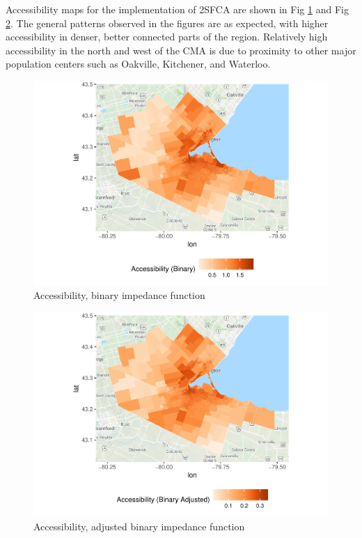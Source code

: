 \documentclass[10pt,letterpaper]{article}
\begin{document}
Accessibility maps for the implementation of 2SFCA are shown in Fig
\ref{fig:fig7-map-accessibility-binary} and Fig
\ref{fig:fig8-map-accessibility-binary-adjusted}. The general patterns
observed in the figures are as expected, with higher accessibility in
denser, better connected parts of the region. Relatively high
accessibility in the north and west of the CMA is due to proximity to
other major population centers such as Oakville, Kitchener, and
Waterloo.

\begin{figure}
\centering
\includegraphics{Supply_and_Demand_Inflation_in_FCA_Methods_v2.0_files/figure-latex/fig7-map-accessibility-binary-1.pdf}
\caption{\label{fig:fig7-map-accessibility-binary}Accessibility, binary
impedance function}
\end{figure}

\begin{figure}
\centering
\includegraphics{Supply_and_Demand_Inflation_in_FCA_Methods_v2.0_files/figure-latex/fig8-map-accessibility-binary-adjusted-1.pdf}
\caption{\label{fig:fig8-map-accessibility-binary-adjusted}Accessibility,
adjusted binary impedance function}
\end{figure}
\end{document}
